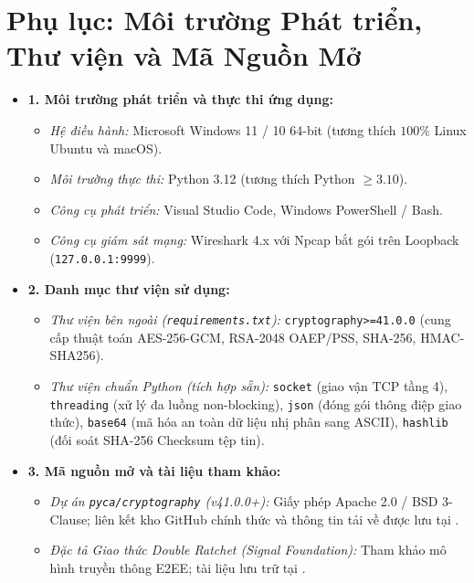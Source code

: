 \documentclass[a4paper,12pt]{article}
\begin{document}
\newpage
\appendix
\section*{Phụ lục: Môi trường Phát triển, Thư viện và Mã Nguồn Mở}

\begin{itemize}
    \item \textbf{1. Môi trường phát triển và thực thi ứng dụng:}
    \begin{itemize}
        \item \textit{Hệ điều hành:} Microsoft Windows 11 / 10 64-bit (tương thích $100\%$ Linux Ubuntu và macOS).
        \item \textit{Môi trường thực thi:} Python 3.12 (tương thích Python $\ge 3.10$).
        \item \textit{Công cụ phát triển:} Visual Studio Code, Windows PowerShell / Bash.
        \item \textit{Công cụ giám sát mạng:} Wireshark 4.x với Npcap bắt gói trên Loopback (\texttt{127.0.0.1:9999}).
    \end{itemize}
    
    \item \textbf{2. Danh mục thư viện sử dụng:}
    \begin{itemize}
        \item \textit{Thư viện bên ngoài (\texttt{requirements.txt}):} \texttt{cryptography>=41.0.0} (cung cấp thuật toán AES-256-GCM, RSA-2048 OAEP/PSS, SHA-256, HMAC-SHA256).
        \item \textit{Thư viện chuẩn Python (tích hợp sẵn):} \texttt{socket} (giao vận TCP tầng 4), \texttt{threading} (xử lý đa luồng non-blocking), \texttt{json} (đóng gói thông điệp giao thức), \texttt{base64} (mã hóa an toàn dữ liệu nhị phân sang ASCII), \texttt{hashlib} (đối soát SHA-256 Checksum tệp tin).
    \end{itemize}

    \item \textbf{3. Mã nguồn mở và tài liệu tham khảo:}
    \begin{itemize}
        \item \textit{Dự án \texttt{pyca/cryptography} (v41.0.0+):} Giấy phép Apache 2.0 / BSD 3-Clause; liên kết kho GitHub chính thức và thông tin tải về được lưu tại .
        \item \textit{Đặc tả Giao thức Double Ratchet (Signal Foundation):} Tham khảo mô hình truyền thông E2EE; tài liệu lưu trữ tại .
    \end{itemize}
\end{itemize}
\end{document}

